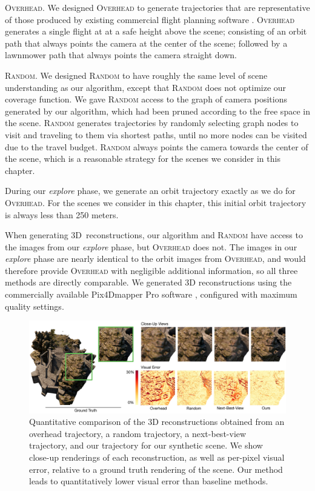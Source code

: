 \textsc{Overhead}.
We designed \textsc{Overhead} to generate trajectories that are representative of those produced by existing commercial flight planning software \cite{3dr:2017a,pix4d:2017a}.
\textsc{Overhead} generates a single flight at at a safe height above the scene; consisting of an orbit path that always points the camera at the center of the scene; followed by a lawnmower path that always points the camera straight down.

\textsc{Random}.
We designed \textsc{Random} to have roughly the same level of scene understanding as our algorithm, except that \textsc{Random} does not optimize our coverage function.
We gave \textsc{Random} access to the graph of camera positions generated by our algorithm, which had been pruned according to the free space in the scene.
\textsc{Random} generates trajectories by randomly selecting graph nodes to visit and traveling to them via shortest paths, until no more nodes can be visited due to the travel budget.
\textsc{Random} always points the camera towards the center of the scene, which is a reasonable strategy for the scenes we consider in this chapter.

During our \emph{explore} phase, we generate an orbit trajectory exactly as we do for \textsc{Overhead}.
For the scenes we consider in this chapter, this initial orbit trajectory is always less than 250 meters.

When generating 3D\ reconstructions, our algorithm and \textsc{Random} have access to the images from our \emph{explore} phase, but \textsc{Overhead} does not.
The images in our \emph{explore} phase are nearly identical to the orbit images from \textsc{Overhead}, and would therefore provide \textsc{Overhead} with negligible additional information, so all three methods are directly comparable.
We generated 3D reconstructions using the commercially available Pix4Dmapper Pro software \cite{pix4d:2017b}, configured with maximum quality settings.

\begin{figure}[t]
\begin{center}
\includegraphics[width=6.0in]{images/2017_iccv/visual_error.jpg}
\end{center}
\caption{
Quantitative comparison of the 3D reconstructions obtained from an overhead trajectory, a random trajectory, a next-best-view trajectory, and our trajectory for our synthetic scene.
We show close-up renderings of each reconstruction, as well as per-pixel visual error, relative to a ground truth rendering of the scene.
Our method leads to quantitatively lower visual error than baseline methods.
}
\label{fig:ch4:results_quantitative}
\end{figure}

